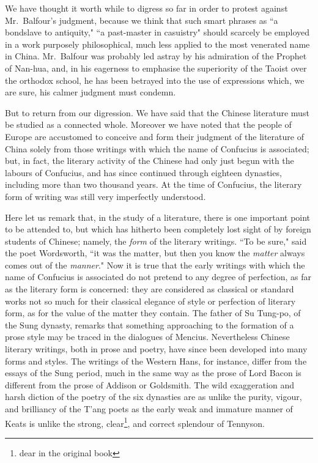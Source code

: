 We have thought it worth while  to digress so far in order to protest against Mr.~Balfour's judgment, because we think that such smart phrases as ``a bondslave to antiquity," ``a past-master in casuistry" should scarcely be employed in a work purposely philosophical, much less applied to the most venerated name in China.
Mr.~Balfour was probably led astray by his admiration of the Prophet of Nan-hua, and, in his eagerness to emphasise the superiority of the Taoist over the orthodox school, he has been betrayed into the use of expressions which, we are sure, his calmer judgment must condemn.

But to return from our digression. 
We have said that the Chinese literature must be studied as a connected whole.
Moreover we have noted that the people of Europe are accustomed to conceive and form their judgment of the literature of China solely from those writings with which the name of Confucius is associated; but, in fact, the literary activity of the Chinese had only just begun with the labours of Confucius, and has since continued through eighteen dynasties, including more than two thousand years.
At the time of Confucius, the literary form of writing was still very imperfectly understood.

Here let us remark that, in the study of a literature, there is one important point to be attended to, but which has hitherto been completely lost sight of by foreign students of Chinese; namely, the \emph{form} of the literary writings.
``To be sure," said the poet Wordsworth, ``it was the matter, but then you know the \emph{matter} always comes out of the \emph{manner}."
Now it is true that the early writings with which the name of Confucius is associated do not pretend to any degree of perfection, as far as the literary form is concerned: they are considered as classical or standard works not so much for their classical elegance of style or perfection of literary form, as for the value of the matter they contain.
The father of Su Tung-po, of the Sung dynasty, remarks that something approaching to the formation of a prose style may be traced in the dialogues of Mencius.
Nevertheless Chinese literary writings, both in prose and poetry, have since been developed into many forms and styles.
The writings of the Western Hans, for instance, differ from the essays of the Sung period, much in the same way as the prose of Lord Bacon is different from the prose of Addison or Goldsmith.
The wild exaggeration and harsh diction of the poetry of the six dynasties are as unlike the purity, vigour, and brilliancy of the T'ang poets as the early weak and immature manner of Keats is unlike the strong, clear\footnote{dear in the original book}, and correct splendour of Tennyson.

